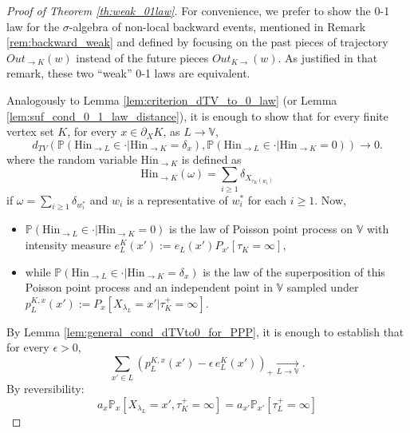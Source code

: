 \documentclass[12pt,a4paper]{article}
\newcommand{\1}[1]{{\mathbf 1}{\{#1\}}}
\newcommand{\8}{{\infty}}
\newcommand{\p}{\mathbb{P}}
\newcommand{\Hin}{\mathrm{Hin}}
\begin{document}
  


\begin{proof}[Proof of Theorem \ref{th:weak_01law}]
  For convenience, we prefer to show the 0-1 law for the $\sigma$-algebra of non-local backward events, mentioned in Remark \ref{rem:backward_weak} and defined by focusing on the past pieces of trajectory $Out_{\rightarrow K}(w)$ instead of the future pieces $Out_{K\rightarrow}(w)$. As justified in that remark, these two ``weak'' 0-1 laws are equivalent.%

  Analogously to Lemma \ref{lem:criterion_dTV_to_0_law} (or Lemma \ref{lem:suf_cond_0_1_law_distance}), it is enough to show that for every finite vertex set $K$, for every $x\in \partial_X K$, as $L\to\mathbb{V}$,
  \begin{equation}\label{eq:criterion_d_TV_cond_bis}
    d_{TV}\left(\mathbb{P}(\Hin_{\to L} \in \cdot | \Hin_{\to K}=\delta_x),
    \mathbb{P}(\Hin_{\to L} \in \cdot | \Hin_{\to K}=0) \right) \to 0.
  \end{equation}
  where the random variable $\Hin_{\to K}$ is defined as
  \begin{equation}
    \Hin_{\to K}(\omega)= \sum_{i\ge 1} \delta_{X_{\tau_K(w_i)}}
  \end{equation}
  if $\omega = \sum_{i\ge 1} \delta_{w_i^*}$ and  $w_i$ is a representative of $w_i^*$ for each $i\ge 1$. 
  Now,
  \begin{itemize} 
    \item  $\mathbb{P}(\Hin_{\to L} \in \cdot | \Hin_{\to K}=0)$ is the law of Poisson point process on $\mathbb{V}$ with intensity measure $e_L^K (x') := e_L(x')P_{x'}[\tau_K=\infty]$,
    \item while $\mathbb{P}(\Hin_{\to L} \in \cdot | \Hin_{\to K}=\delta_x)$ is the law of the superposition of this Poisson point process and an independent point in $\mathbb{V}$ sampled under $p_L^{K, x} (x') := P_x[X_{\lambda_L}=x'|\tau_K^+=\infty]$.
  \end{itemize}
  By Lemma \ref{lem:general_cond_dTVto0_for_PPP}, it is enough to establish that for every $\epsilon>0$, 
\begin{equation}\label{eq:sum_pLKxy-epshLK_to0_weak}
  \sum_{x'  \in  L} 
  \left(p_L^{K, x}(x') 
  - \epsilon \, e_L^{K}(x') \right)_+ \underset{L \to \mathbb{V}}{\longrightarrow}.
\end{equation}
By reversibility:
\begin{equation}
  a_x \p_x[X_{\lambda_L}=x', \tau_K^+=\infty]  = a_{x'} \p_{x'}[\tau_L^+=\infty] 

\end{equation}
\end{proof}
\end{document}
